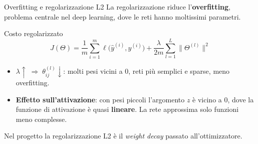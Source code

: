 \documentclass[aspectratio=169]{beamer}
\begin{document}
\begin{frame}{Overfitting e regolarizzazione L2}
  La regolarizzazione riduce l'\textbf{overfitting}, problema centrale nel deep
  learning, dove le reti hanno moltissimi parametri.
  \begin{block}{Costo regolarizzato}
    \[ J(\Theta) = \frac{1}{m}\sum_{i=1}^{m} \ell\big(\hat{y}^{(i)},y^{(i)}\big)
       + \frac{\lambda}{2m}\sum_{l=1}^{L}\big\lVert\Theta^{(l)}\big\rVert^2 \]
  \end{block}
  \begin{itemize}
    \item $\lambda \uparrow \;\Rightarrow\; \theta_{ij}^{(l)} \downarrow$: molti
          pesi vicini a 0, reti più semplici e sparse, meno overfitting.
    \item \textbf{Effetto sull'attivazione}: con pesi piccoli l'argomento $z$ è
          vicino a 0, dove la funzione di attivazione è quasi
          \textbf{lineare}. La rete approssima solo funzioni meno complesse.
  \end{itemize}
  \begin{center}
    \small Nel progetto la regolarizzazione L2 è il \emph{weight decay} passato
    all'ottimizzatore.
  \end{center}
\end{frame}
\end{document}
